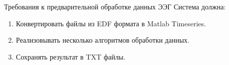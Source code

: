 \begin{frame}{Требования к предварительной обработке данных ЭЭГ}
    Система должна:
    \begin{enumerate}
        \item Конвертировать файлы из EDF формата в Matlab Timeseries.
        \item Реализовывать несколько алгоритмов обработки данных.
        \item Сохранять результат в TXT файлы.
	\end{enumerate}
\end{frame}
